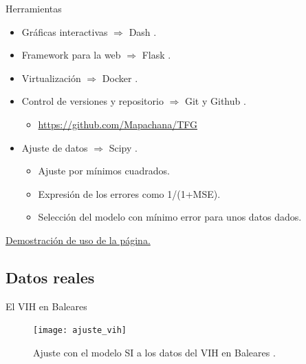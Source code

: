 \begin{frame}{Herramientas}

    \begin{itemize}
        \item Gráficas interactivas $\Rightarrow$ Dash \cite{dash}.
        \pause
        \item Framework para la web $\Rightarrow$ Flask \cite{flask}.
        \pause
        \item Virtualización $\Rightarrow$ Docker \cite{docker}.
        \pause
        \item Control de versiones y repositorio $\Rightarrow$ Git y Github \cite{git}.
        \begin{itemize}
            \item \href{https://github.com/Mapachana/TFG}{https://github.com/Mapachana/TFG}
        \end{itemize}
        \pause
        \item Ajuste de datos $\Rightarrow$ Scipy \cite{scipy_curvefit}.
        \begin{itemize}
            \item Ajuste por mínimos cuadrados.
            \item Expresión de los errores como 1/(1+MSE).
            \item Selección del modelo con mínimo error para unos datos dados.
        \end{itemize}
    \end{itemize}

    \pause

    \href{run:./demo_plotsir.mkv}{Demostración de uso de la página.}

\end{frame}


\subsection{Datos reales}


\begin{frame}{El VIH en Baleares}

    \begin{figure}
        \begin{center}
        \caption{Ajuste con el modelo SI a los datos del VIH en Baleares \cite{datos_vih}.}
        \label{ajuste_vih}
        \texttt{[image: ajuste\_vih]}
        \end{center}
        \end{figure}
\end{frame}


